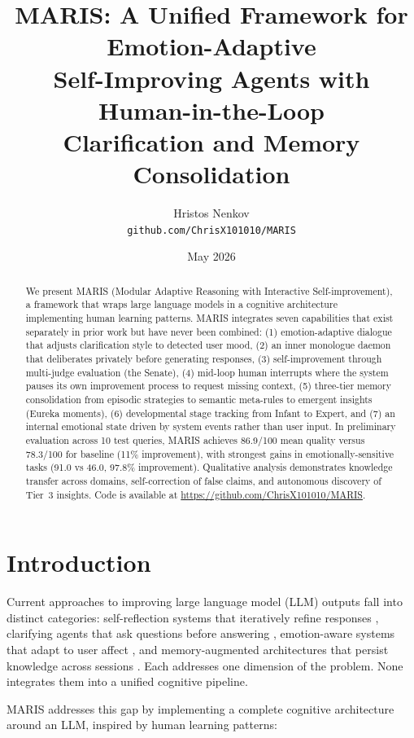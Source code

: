 \documentclass[11pt,a4paper]{article}
\title{\textbf{MARIS: A Unified Framework for Emotion-Adaptive\\Self-Improving Agents with Human-in-the-Loop\\Clarification and Memory Consolidation}}
\author{Hristos Nenkov\\\texttt{github.com/ChrisX101010/MARIS}}
\date{May 2026}
\begin{document}
\maketitle

\begin{abstract}
We present MARIS (Modular Adaptive Reasoning with Interactive Self-improvement), a framework that wraps large language models in a cognitive architecture implementing human learning patterns. MARIS integrates seven capabilities that exist separately in prior work but have never been combined: (1) emotion-adaptive dialogue that adjusts clarification style to detected user mood, (2) an inner monologue daemon that deliberates privately before generating responses, (3) self-improvement through multi-judge evaluation (the Senate), (4) mid-loop human interrupts where the system pauses its own improvement process to request missing context, (5) three-tier memory consolidation from episodic strategies to semantic meta-rules to emergent insights (Eureka moments), (6) developmental stage tracking from Infant to Expert, and (7) an internal emotional state driven by system events rather than user input. In preliminary evaluation across 10 test queries, MARIS achieves 86.9/100 mean quality versus 78.3/100 for baseline (11\% improvement), with strongest gains in emotionally-sensitive tasks (91.0 vs 46.0, 97.8\% improvement). Qualitative analysis demonstrates knowledge transfer across domains, self-correction of false claims, and autonomous discovery of Tier~3 insights. Code is available at \url{https://github.com/ChrisX101010/MARIS}.
\end{abstract}

\section{Introduction}

Current approaches to improving large language model (LLM) outputs fall into distinct categories: self-reflection systems that iteratively refine responses \cite{madaan2023selfrefine,shinn2023reflexion}, clarifying agents that ask questions before answering \cite{aria2026}, emotion-aware systems that adapt to user affect \cite{affectivecomputing2026}, and memory-augmented architectures that persist knowledge across sessions \cite{evosc2026}. Each addresses one dimension of the problem. None integrates them into a unified cognitive pipeline.

MARIS addresses this gap by implementing a complete cognitive architecture around an LLM, inspired by human learning patterns:
\end{document}

